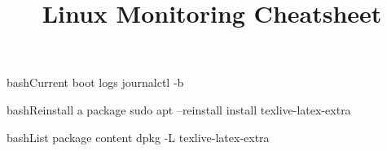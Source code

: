 \documentclass[10pt,a4paper]{article}
\title{\color{w3schools}Linux Monitoring Cheatsheet
}
\begin{document}
\maketitle

\small
\begin{multicols}{3}

\thispagestyle{empty}
\scriptsize



\begin{codebox}{bash}{Current boot logs}
journalctl -b

\end{codebox}

\begin{codebox}{bash}{Reinstall a package}
sudo apt --reinstall install texlive-latex-extra

\end{codebox}

\begin{codebox}{bash}{List package content}
dpkg -L texlive-latex-extra

\end{codebox}


\AtNextBibliography{\footnotesize}
\printbibliography  
\end{multicols}
\end{document}
